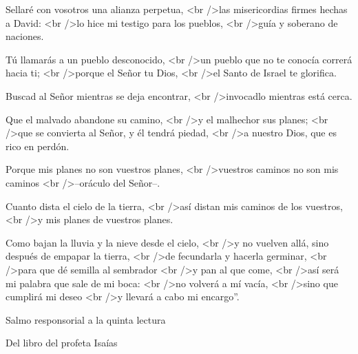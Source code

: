 			\begin{readtalk}Sellaré con vosotros una alianza perpetua, <br />las misericordias firmes hechas a David: <br />lo hice mi testigo para los pueblos, <br />guía y soberano de naciones. \end{readtalk}
			
			\begin{readtalk}Tú llamarás a un pueblo desconocido, <br />un pueblo que no te conocía correrá hacia ti; <br />porque el Señor tu Dios, <br />el Santo de Israel te glorifica. \end{readtalk}
			
			\begin{readtalk}Buscad al Señor mientras se deja encontrar, <br />invocadlo mientras está cerca. \end{readtalk}
			
			\begin{readtalk}Que el malvado abandone su camino, <br />y el malhechor sus planes; <br />que se convierta al Señor, y él tendrá piedad, <br />a nuestro Dios, que es rico en perdón. \end{readtalk}
			
			\begin{readtalk}Porque mis planes no son vuestros planes, <br />vuestros caminos no son mis caminos <br />–oráculo del Señor–. \end{readtalk}
			
			\begin{readtalk}Cuanto dista el cielo de la tierra, <br />así distan mis caminos de los vuestros, <br />y mis planes de vuestros planes. \end{readtalk}
			
			\begin{readtalk}Como bajan la lluvia y la nieve desde el cielo, <br />y no vuelven allá, sino después de empapar la tierra, <br />de fecundarla y hacerla germinar, <br />para que dé semilla al sembrador <br />y pan al que come, <br />así será mi palabra que sale de mi boca: <br />no volverá a mí vacía, <br />sino que cumplirá mi deseo <br />y llevará a cabo mi encargo”.\end{readtalk}
			
			\begin{readtitle}Salmo responsorial a la quinta lectura\end{readtitle}
			
			\begin{readbook}Del libro del profeta Isaías \end{readbook}
			

